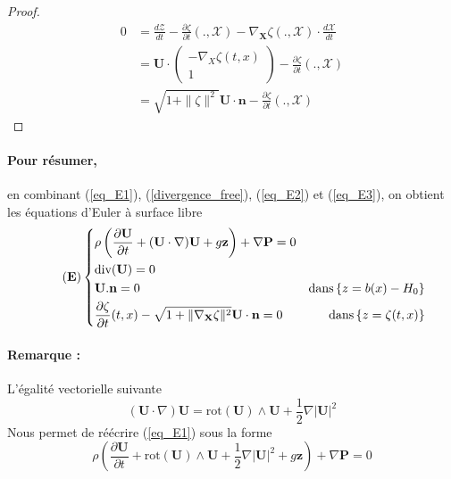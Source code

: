 \documentclass[12pt,a4paper]{article}
\newcommand{\rot}{\text{rot}}
\numberwithin{equation}{section}
\begin{document}
\begin{proof}
\begin{align*}
    0 &= \frac{d\mathcal{Z}}{dt} - \frac{\partial \zeta}{\partial t}(.,\mathcal{X}) - \nabla_\textbf{X}\zeta(.,\mathcal{X}) \cdot \frac{d \mathcal{X}}{dt} \\ 
    &=  \textbf{U}\cdot  \left(\begin{array}{l}
         - \nabla_X\zeta(t,x)\\
         1
    \end{array}\right) - \frac{\partial \zeta}{\partial t}(.,\mathcal{X}) 
    \\&= \sqrt{1 + \|\zeta\|^2}\textbf{U}  \cdot \textbf{n} - \frac{\partial \zeta}{\partial t}(.,\mathcal{X}) 
\end{align*}



\end{proof}

\paragraph{Pour résumer,} en combinant (\ref{eq_E1}), (\ref{divergence_free}), (\ref{eq_E2}) et (\ref{eq_E3}), on obtient les équations d'Euler à surface libre
\begin{equation} \tag{\textbf{E}}
    \left\{ 
    \begin{aligned}
        &\rho \left ( \frac{\partial \textbf{U}}{\partial t} + (\textbf{U}\cdot \nabla ) \textbf{U}+  g\textbf{z}  \right) + \nabla \textbf{P} = 0 & &  
        \\
        &\text{div}(\textbf{U}) = 0 & &  
        \\
        &\textbf{U}.\textbf{n} = 0 &\text{dans}\,\{z = b(x)-H_0\}& 
        \\
        &\frac{\partial \zeta}{\partial t}(t,x) - \sqrt{1+ \| \nabla_\textbf{X}\zeta\|^2} \textbf{U} \cdot \textbf{n} = 0 &\text{dans}\,\{z = \zeta(t,x)\} & 
    \end{aligned}
    \right.
\end{equation}
\paragraph{Remarque :} L'égalité vectorielle suivante
$$(\textbf{U}\cdot \nabla ) \textbf{U} = \rot(\textbf{U})\wedge \textbf{U} + \frac{1}{2}\nabla |\textbf{U}|^2$$
Nous permet de réécrire (\ref{eq_E1}) sous la forme
\begin{equation} \label{eq_E1bis}
    \rho \left( \frac{\partial \textbf{U}}{\partial t} +\rot(\textbf{U})\wedge \textbf{U} + \frac{1}{2}\nabla |\textbf{U}|^2+  g\textbf{z}  \right) + \nabla \textbf{P} = 0 
\end{equation}
\end{document}
